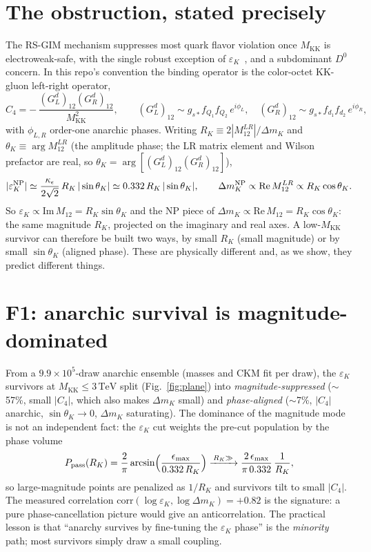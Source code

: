 \documentclass[11pt]{article}
\newcommand{\MKK}{M_{\mathrm{KK}}}
\newcommand{\epsK}{\varepsilon_K}
\newcommand{\dmK}{\Delta m_K}
\newcommand{\TeV}{\,\mathrm{TeV}}
\newcommand{\GL}{(G_L^d)}
\newcommand{\GR}{(G_R^d)}
\begin{document}
\section{The obstruction, stated precisely}
The RS-GIM mechanism suppresses most quark flavor violation once $\MKK$ is
electroweak-safe, with the single robust exception of $\epsK$~\cite{CFW,Blanke},
and a subdominant $D^0$ concern. In this repo's convention the binding operator is
the color-octet KK-gluon left-right operator,
\begin{equation}
  C_4 = -\,\frac{\GL_{12}\GR_{12}}{\MKK^2},\qquad
  \GL_{12}\sim g_{s*} f_{Q_1}f_{Q_2}\,e^{i\phi_L},\quad
  \GR_{12}\sim g_{s*} f_{d_1}f_{d_2}\,e^{i\phi_R},
\end{equation}
with $\phi_{L,R}$ order-one anarchic phases. Writing $R_K\equiv 2|M_{12}^{LR}|/\dmK$
and $\theta_K\equiv\arg M_{12}^{LR}$ (the amplitude phase; the LR matrix element and
Wilson prefactor are real, so $\theta_K=\arg[\GL_{12}\GR_{12}]$),
\begin{equation}
  |\epsK^{\rm NP}| \simeq \frac{\kappa_\epsilon}{2\sqrt2}\,R_K\,|\sin\theta_K|
  \simeq 0.332\,R_K\,|\sin\theta_K|,\qquad
  \dmK^{\rm NP}\propto \mathrm{Re}\,M_{12}^{LR}\propto R_K\cos\theta_K .
\end{equation}
So $\epsK\propto\mathrm{Im}\,M_{12}=R_K\sin\theta_K$ and the NP piece of $\dmK\propto
\mathrm{Re}\,M_{12}=R_K\cos\theta_K$: the same magnitude $R_K$, projected on the
imaginary and real axes. A low-$\MKK$ survivor can
therefore be built two ways, by small $R_K$ (small magnitude) or by small
$\sin\theta_K$ (aligned phase). These are physically different and, as we show, they
predict different things.

\section{F1: anarchic survival is magnitude-dominated}
From a $9.9\times10^5$-draw anarchic ensemble (masses and CKM fit per draw), the
$\epsK$ survivors at $\MKK\le3\TeV$ split (Fig.~\ref{fig:plane}) into
\emph{magnitude-suppressed} ($\sim$57\%, small $|C_4|$, which also makes $\dmK$
small) and \emph{phase-aligned} ($\sim$7\%, $|C_4|$ anarchic, $\sin\theta_K\to0$,
$\dmK$ saturating). The dominance of the magnitude mode is not an independent fact:
the $\epsK$ cut weights the pre-cut population by the phase volume
\begin{equation}
  P_{\rm pass}(R_K)=\frac{2}{\pi}\arcsin\!\Big(\frac{\epsilon_{\max}}{0.332\,R_K}\Big)
  \xrightarrow{\,R_K\gg\,} \frac{2\,\epsilon_{\max}}{\pi\,0.332}\,\frac{1}{R_K},
\end{equation}
so large-magnitude points are penalized as $1/R_K$ and survivors tilt to small
$|C_4|$. The measured correlation $\mathrm{corr}(\log\epsK,\log\dmK)=+0.82$ is the
signature: a pure phase-cancellation picture would give an anticorrelation. The
practical lesson is that ``anarchy survives by fine-tuning the $\epsK$ phase'' is the
\emph{minority} path; most survivors simply draw a small coupling.
\end{document}
